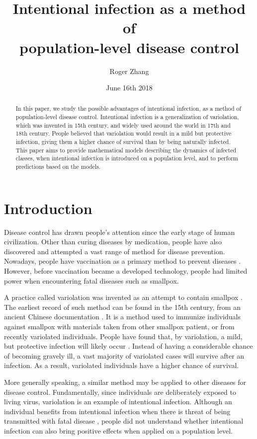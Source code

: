 \documentclass[12pt]{article}
\title{Intentional infection as a method of\\population-level disease control}
\author{Roger Zhang}
\date{June 16th 2018}
\begin{document}
\linenumbers
\maketitle
\begin{abstract}
In this paper, we study the possible advantages of intentional infection, as a method of population-level disease control. Intentional infection is a generalization of variolation, which was invented in 15th century, and widely used around the world in 17th and 18th century. People believed that variolation would result in a mild but protective infection, giving them a higher chance of survival than by being naturally infected. This paper aims to provide mathematical models describing the dynamics of infected classes, when intentional infection is introduced on a population level, and to perform predictions based on the models.
\end{abstract}
\clearpage
\tableofcontents
\clearpage
\section{Introduction}

Disease control has drawn people's attention since the early stage of human civilization. Other than curing diseases by medication, people have also discovered and attempted a vast range of method for disease prevention. Nowadays, people have vaccination as a primary method to prevent diseases \cite{bloom2006priorities}. However, before vaccination became a developed technology, people had limited power when encountering fatal diseases such as smallpox.

A practice called variolation was invented as an attempt to contain smallpox \cite{henderson1976eradication}. The earliest record of such method can be found in the 15th century, from an ancient Chinese documentation \cite{leung2011variolation}. It is a method used to immunize individuals against smallpox with materials taken from other smallpox patient, or from recently variolated individuals. People have found that, by variolation, a mild, but protective infection will likely occur \cite{leung2011variolation}. Instead of having a considerable chance of becoming gravely ill, a vast majority of variolated cases will survive after an infection. As a result, variolated individuals have a higher chance of survival.

More generally speaking, a similar method may be applied to other diseases for disease control. Fundamentally, since individuals are deliberately exposed to living virus, variolation is an example of intentional infection. Although an individual benefits from intentional infection when there is threat of being transmitted with fatal disease \cite{leung2011variolation}, people did not understand whether intentional infection can also bring positive effects when applied on a population level. 
\end{document}
